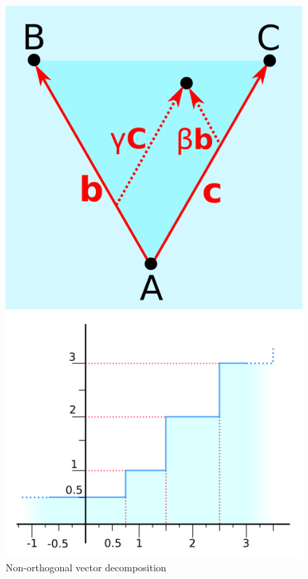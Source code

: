 \documentclass[11pt, oneside]{report}   	%
\begin{document}
\begin{figure}
	\vspace{-10pt}
	\includegraphics[width = \textwidth/3]{BlendVectors.png}
	\caption{Non-orthogonal vector decomposition}
	\label{fig:BlendingVectors}
	\includegraphics[width = \textwidth/3]{FreqCoarse.png}

\end{figure}
\end{document}
